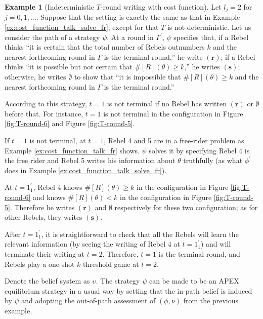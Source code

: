\documentclass[12pt,letter]{article}
\theoremstyle{definition}
\newtheorem{example}{Example}
\theoremstyle{remark}
\theoremstyle{claim}
\begin{document}
\begin{example}[Indeterministic $T$-round writing with cost function]
\label{ex:cost_function_talk_solve_fr_Indm}
Let $l_j=2$ for $j=0,1,...$. Suppose that the setting is exactly the same as that in Example \ref{ex:cost_function_talk_solve_fr}, except for that $T$ is not deterministic. Let us consider the path of a strategy $\psi$. At a round in $\Gamma^{'}$, $\psi$ specifies that, if a Rebel thinks ``it is certain that the total number of Rebels outnumbers $k$ and the nearest forthcoming round in $\Gamma$ is the terminal round,'' he write $(\textbf{r})$; if a Rebel thinks ``it is possible but not certain that $\# [R](\theta)\geq k$,'' he writes $(\textbf{s})$; otherwise, he writes $\emptyset$ to show that ``it is impossible that $\#[R](\theta)\geq k$ and the nearest forthcoming round in $\Gamma$ is the terminal round.'' 

According to this strategy, $t=1$ is not terminal if no Rebel has written $(\textbf{r})$ or $\emptyset$ before that. For instance, $t=1$ is not terminal in the configuration in Figure \ref{fig:T-round-6} and Figure \ref{fig:T-round-5}. 

If $t=1$ is not terminal, at $t=1$, Rebel 4 and 5 are in a free-rider problem as Example \ref{ex:cost_function_talk_fr} shows. $\psi$ solves it by specifying Rebel 4 is the free rider and Rebel 5 writes his information about $\theta$ truthfully (as what $\phi^{'}$ does in Example \ref{ex:cost_function_talk_solve_fr}). 

At $t=1^{'}_1$, Rebel 4 knows $\#[R](\theta)\geq k$ in the configuration in Figure \ref{fig:T-round-6} and knows $\#[R](\theta)< k$ in the configuration in Figure \ref{fig:T-round-5}. Therefore he writes $(\textbf{r})$ and $\emptyset$ respectively for these two configuration; as for other Rebels, they writes $(\textbf{s})$. 

After $t=1^{'}_1$, it is straightforward to check that all the Rebels will learn the relevant information (by seeing the writing of Rebel 4 at $t=1^{'}_1$) and will terminate their writing at $t=2$. Therefore, $t=1$ is the terminal round, and Rebels play a one-shot $k$-threshold game at $t=2$.

Denote the belief system as $\upsilon$. The strategy $\psi$ can be made to be an APEX equilibrium strategy in a usual way by setting that the in-path belief is induced by $\psi$ and adopting the out-of-path assessment of $(\phi,\nu)$ from the previous example.
\end{example}
\end{document}
